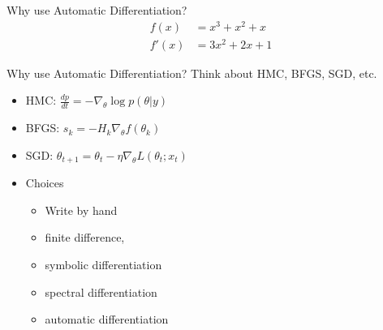 \documentclass[dvipsnames]{beamer}
\begin{document}
\begin{frame}{Why use Automatic Differentiation?}
\begin{align}
    f(x) &= x^3 + x^2 + x\\
    f'(x) &= 3x^2 + 2x + 1
\end{align}
\centering
{}
\end{frame}

\begin{frame}{Why use Automatic Differentiation?}
Think about HMC, BFGS, SGD, etc.
\begin{itemize}
    \item HMC: $\frac{dp}{dt}=-\nabla_\theta\log p(\theta|y)$
    \item BFGS: $s_k=-H_k \nabla_\theta f(\theta_k)$
    \item SGD: $\theta_{t+1}=\theta_t−\eta\nabla_\theta L(\theta_t;x_t)$
\end{itemize}
\begin{itemize}
    \item Choices
    \begin{itemize}
        \item Write by hand
        \item finite difference,
        \item symbolic differentiation
        \item spectral differentiation
        \item automatic differentiation
    \end{itemize}
\end{itemize}

\end{frame}
\end{document}
